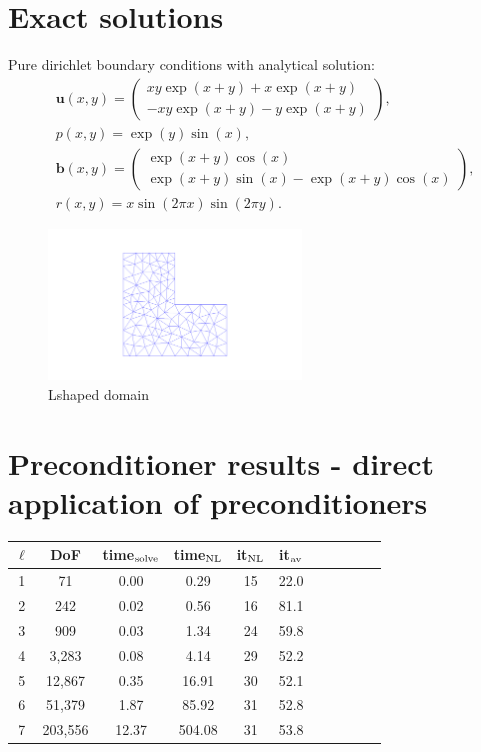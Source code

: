 \documentclass{article}
\newcommand{\uu}[1]{\boldsymbol #1}
\begin{document}
\section*{Exact solutions}

Pure dirichlet boundary conditions with analytical solution:
\begin{align*} \nonumber
&\uu{u}(x,y)= \begin{pmatrix}
  xy\exp(x + y) + x\exp(x + y)\\
  -xy\exp(x + y) - y\exp(x + y)
\end{pmatrix}, \\
&p(x,y) = \exp(y)\sin(x),\\
&\uu{b}(x,y) = \begin{pmatrix}
 \exp(x + y)\cos(x) \\
 \exp(x + y)\sin(x) - \exp(x + y)\cos(x)
\end{pmatrix}, \\
 &r(x,y) = x\sin(2\pi x)\sin(2\pi y).
\end{align*}



\begin{figure}[h!]
    \centering
    \includegraphics[width=0.6\textwidth]{../Lshaped.png}
    \caption{Lshaped domain}
    \label{fig:awesome_image}
\end{figure}
\section*{Preconditioner results - direct application of preconditioners}

\begin{table}[h!]
\centering
\begin{tabular}{ccccccccccc}
\hline
$\ell$ & DoF &  time$_{\rm solve}$ &  time$_{\rm NL}$ &  it$_{\rm NL}$ & it$_{\rm av}$ \\
\hline
1 &      71 & 0.00 & 0.29 & 15 & 22.0 \\
2 &     242 & 0.02 & 0.56 & 16 & 81.1 \\
3 &     909 & 0.03 & 1.34 & 24 & 59.8 \\
4 &    3,283 & 0.08 & 4.14 & 29 & 52.2 \\
5 &   12,867 & 0.35 & 16.91 & 30 & 52.1 \\
6 &   51,379 & 1.87 & 85.92 & 31 & 52.8 \\
7 &  203,556 & 12.37 & 504.08 & 31 & 53.8 \\
\hline
\end{tabular}
\end{table}
\end{document}

